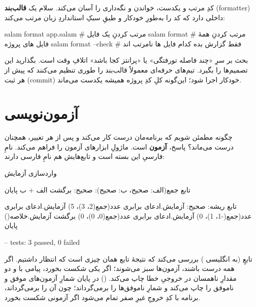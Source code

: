 کدِ مرتب و یکدست، خواندن و نگه‌داری را آسان می‌کند. سلام یک \textbf{قالب‌بند}
(formatter) داخلی دارد که کد را به‌طورِ خودکار و طبقِ سبکِ استانداردِ زبان مرتب
می‌کند:

\begin{salamen}[language={}]
salam format app.salam     # مرتب کردنِ یک فایل
salam format               # مرتب کردنِ همهٔ فایل های پروژه
salam format --check       # فقط گزارش بده کدام فایل ها نامرتب اند
\end{salamen}

\begin{tip}
بحث بر سرِ «چند فاصله تورفتگی» یا «پرانتز کجا باشد» اتلافِ وقت است. بگذارید
 این تصمیم‌ها را بگیرد. تیم‌های حرفه‌ای معمولاً قالب‌بند را
طوری تنظیم می‌کنند که پیش از هر ثبت (commit) خودکار اجرا شود؛ این‌گونه کلِ کدِ
پروژه همیشه یکدست می‌ماند.
\end{tip}

\section{آزمون‌نویسی}

چگونه مطمئن شویم که برنامه‌مان درست کار می‌کند و پس از هر تغییر، همچنان درست
می‌ماند؟ پاسخ، \textbf{آزمون} است. ماژولِ  ابزارهای آزمون را
فراهم می‌کند. نامِ فارسیِ این بسته  است و تابع‌هایش هم نامِ
فارسی دارند:

\begin{salamfa}
واردسازی آزمایش

تابع جمع(الف: صحیح، ب: صحیح): صحیح: برگشت الف + ب پایان

تابع ریشه: صحیح:
    آزمایش.ادعای برابری عدد(جمع(2، 3)، 5)
    آزمایش.ادعای برابری عدد(جمع(-1، 1)، 0)
    آزمایش.ادعای برابری عدد(جمع(0، 0)، 0)
    برگشت آزمایش.خلاصه()
پایان
\end{salamfa}

\begin{progout}
--
tests: 3 passed, 0 failed
\end{progout}

تابعِ  (به انگلیسی
) بررسی می‌کند که نتیجهٔ تابع همان
چیزی است که انتظار داشتیم. اگر همه درست باشند، آزمون‌ها سبز می‌شوند؛ اگر یکی
شکست بخورد، پیامی با  و دو مقدارِ ناهمسان در خروجیِ خطا چاپ می‌کند.
 () در پایان شمارِ آزمون‌های موفق و ناموفق را چاپ
می‌کند و شمارِ ناموفق‌ها را برمی‌گرداند؛ چون  آن را برمی‌گرداند،
برنامه با کدِ خروجِ غیرِ صفر تمام می‌شود اگر آزمونی شکست بخورد.


